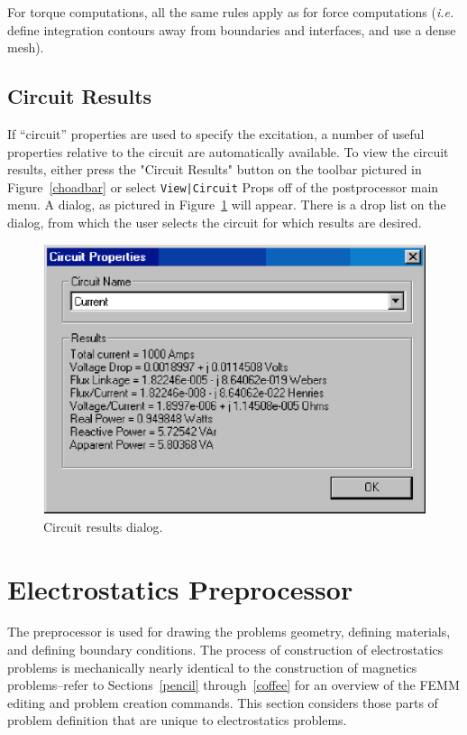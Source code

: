\documentclass[12pt]{report}
\begin{document}
For torque computations, all the same rules apply as for force
computations ({\em i.e.} define integration contours away from
boundaries and interfaces, and use a dense mesh).

\subsection{Circuit Results}

If ``circuit'' properties are used to specify the excitation, a
number of useful properties relative to the circuit are automatically
available.
To view the circuit results, either press the "Circuit Results"
button on the toolbar pictured in Figure~\ref{choadbar}
or select \verb+View|Circuit+ Props off
of the postprocessor main menu. A dialog, as pictured in
Figure~\ref{circuitresults} will appear. There is a drop list on
the dialog, from which the user selects the circuit for which
results are desired.
\begin{figure}
\centerline{\includegraphics{circuitrslt.ps}}
\caption{Circuit results dialog.}
\label{circuitresults}
\end{figure}



\section{Electrostatics Preprocessor}

The preprocessor is used for drawing the problems geometry, defining
materials, and defining boundary conditions. The process of construction of electrostatics
problems is mechanically nearly identical to the construction of
magnetics problems--refer to Sections~\ref{pencil} through~\ref{coffee} for
an overview of the FEMM editing and problem creation commands. This section
considers those parts of problem definition that are unique to electrostatics problems.
\end{document}
